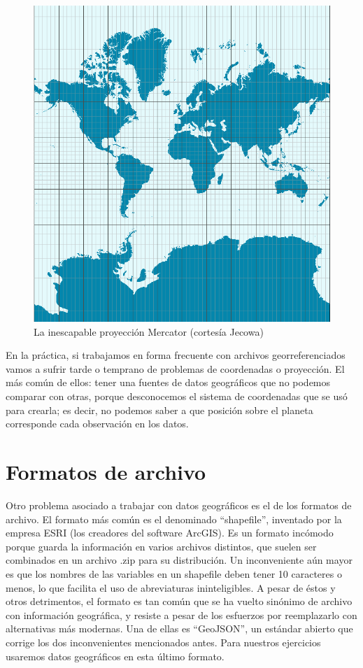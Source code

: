 \documentclass[spanish,]{book}
\begin{document}
\begin{figure}
\includegraphics[width=1\linewidth]{imagenes/Mercator-proj} \caption{La inescapable proyección Mercator (cortesía Jecowa)}\label{fig:unnamed-chunk-144}
\end{figure}

En la práctica, si trabajamos en forma frecuente con archivos georreferenciados vamos a sufrir tarde o temprano de problemas de coordenadas o proyección. El más común de ellos: tener una fuentes de datos geográficos que no podemos comparar con otras, porque desconocemos el sistema de coordenadas que se usó para crearla; es decir, no podemos saber a que posición sobre el planeta corresponde cada observación en los datos.

\hypertarget{formatos-de-archivo}{%
\section{Formatos de archivo}\label{formatos-de-archivo}}

Otro problema asociado a trabajar con datos geográficos es el de los formatos de archivo. El formato más común es el denominado ``shapefile'', inventado por la empresa ESRI (los creadores del software ArcGIS). Es un formato incómodo porque guarda la información en varios archivos distintos, que suelen ser combinados en un archivo .zip para su distribución. Un inconveniente aún mayor es que los nombres de las variables en un shapefile deben tener 10 caracteres o menos, lo que facilita el uso de abreviaturas ininteligibles. A pesar de éstos y otros detrimentos, el formato es tan común que se ha vuelto sinónimo de archivo con información geográfica, y resiste a pesar de los esfuerzos por reemplazarlo con alternativas más modernas. Una de ellas es ``GeoJSON'', un estándar abierto que corrige los dos inconvenientes mencionados antes. Para nuestros ejercicios usaremos datos geográficos en esta último formato.
\end{document}
